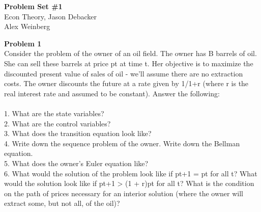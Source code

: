 \documentclass[letterpaper,12pt]{article}
\theoremstyle{definition}
\begin{document}
\begin{flushleft}
  \textbf{\large{Problem Set \#1}} \\
  Econ Theory, Jason Debacker \\
  Alex Weinberg
\end{flushleft}

\vspace{5mm}



\noindent\textbf{Problem 1} ~\\
Consider the problem of the owner of an oil field. The owner has B barrels of oil. She can
sell these barrels at price pt at time t. Her objective is to maximize the discounted present
value of sales of oil - we’ll assume there are no extraction costs. The owner discounts the
future at a rate given by 1/1+r (where r is the real interest rate and assumed to be constant). Answer the following: \\~\\
1. What are the state variables? \\
2. What are the control variables? \\
3. What does the transition equation look like? \\
4. Write down the sequence problem of the owner. Write down the Bellman equation. \\
5. What does the owner’s Euler equation like? \\
6. What would the solution of the problem look like if pt+1 = pt for all t? What would the solution look like if pt+1 > (1 + r)pt for all t? What is the condition on the path of prices necessary for an interior solution (where the owner will extract some, but not all, of the oil)?
\end{document}
